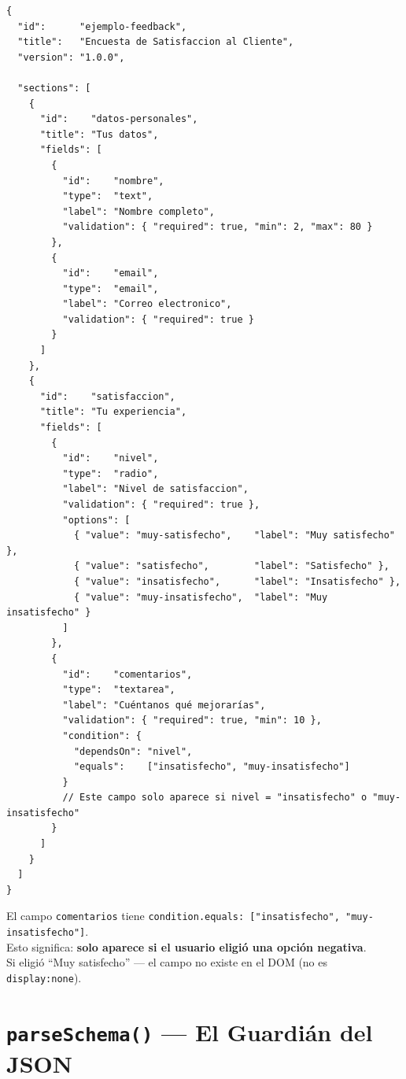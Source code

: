 \documentclass[12pt, a4paper]{article}
\begin{document}
\begin{lstlisting}
{
  "id":      "ejemplo-feedback",
  "title":   "Encuesta de Satisfaccion al Cliente",
  "version": "1.0.0",

  "sections": [
    {
      "id":    "datos-personales",
      "title": "Tus datos",
      "fields": [
        {
          "id":    "nombre",
          "type":  "text",
          "label": "Nombre completo",
          "validation": { "required": true, "min": 2, "max": 80 }
        },
        {
          "id":    "email",
          "type":  "email",
          "label": "Correo electronico",
          "validation": { "required": true }
        }
      ]
    },
    {
      "id":    "satisfaccion",
      "title": "Tu experiencia",
      "fields": [
        {
          "id":    "nivel",
          "type":  "radio",
          "label": "Nivel de satisfaccion",
          "validation": { "required": true },
          "options": [
            { "value": "muy-satisfecho",    "label": "Muy satisfecho" },
            { "value": "satisfecho",        "label": "Satisfecho" },
            { "value": "insatisfecho",      "label": "Insatisfecho" },
            { "value": "muy-insatisfecho",  "label": "Muy insatisfecho" }
          ]
        },
        {
          "id":    "comentarios",
          "type":  "textarea",
          "label": "Cuéntanos qué mejorarías",
          "validation": { "required": true, "min": 10 },
          "condition": {
            "dependsOn": "nivel",
            "equals":    ["insatisfecho", "muy-insatisfecho"]
          }
          // Este campo solo aparece si nivel = "insatisfecho" o "muy-insatisfecho"
        }
      ]
    }
  ]
}
\end{lstlisting}

\begin{tcolorbox}[importante, title={\emoji{eyes} \emoji{star} Observa la Lógica Condicional}]
  El campo \texttt{comentarios} tiene \texttt{condition.equals: ["insatisfecho", "muy-insatisfecho"]}.\\[0.3cm]
  Esto significa: \textbf{solo aparece si el usuario eligió una opción negativa}.\\
  Si eligió ``Muy satisfecho'' --- el campo no existe en el DOM (no es \texttt{display:none}).
\end{tcolorbox}

\section{  \texttt{parseSchema()} --- El Guardián del JSON}
\end{document}
